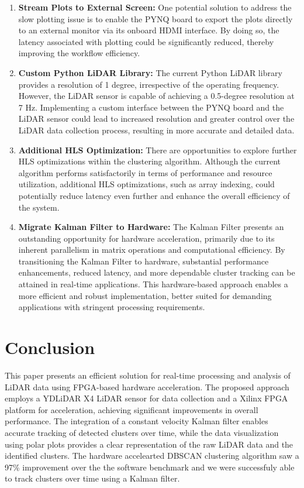 \documentclass[journal]{IEEEtran} %
\begin{document}
\begin{enumerate}
\item \textbf{Stream Plots to External Screen:}
One potential solution to address the slow plotting issue is to enable the PYNQ board to export the plots directly to an external monitor via its onboard HDMI interface. By doing so, the latency associated with plotting could be significantly reduced, thereby improving the workflow efficiency.

\item \textbf{Custom Python LiDAR Library:}
The current Python LiDAR library provides a resolution of 1 degree, irrespective of the operating frequency. However, the LiDAR sensor is capable of achieving a 0.5-degree resolution at 7 Hz. Implementing a custom interface between the PYNQ board and the LiDAR sensor could lead to increased resolution and greater control over the LiDAR data collection process, resulting in more accurate and detailed data.

\item \textbf{Additional HLS Optimization:}
There are opportunities to explore further HLS optimizations within the clustering algorithm. Although the current algorithm performs satisfactorily in terms of performance and resource utilization, additional HLS optimizations, such as array indexing, could potentially reduce latency even further and enhance the overall efficiency of the system.

\item \textbf{Migrate Kalman Filter to Hardware:}
The Kalman Filter presents an outstanding opportunity for hardware acceleration, primarily due to its inherent parallelism in matrix operations and computational efficiency. By transitioning the Kalman Filter to hardware, substantial performance enhancements, reduced latency, and more dependable cluster tracking can be attained in real-time applications. This hardware-based approach enables a more efficient and robust implementation, better suited for demanding applications with stringent processing requirements.

\end{enumerate}

\section{Conclusion}

This paper presents an efficient solution for real-time processing and analysis of LiDAR data using FPGA-based hardware acceleration. The proposed approach employs a YDLiDAR X4 LiDAR sensor for data collection and a Xilinx FPGA platform for acceleration, achieving significant improvements in overall performance. The integration of a constant velocity Kalman filter enables accurate tracking of detected clusters over time, while the data visualization using polar plots provides a clear representation of the raw LiDAR data and the identified clusters. The hardware accelearted DBSCAN clustering algorithm saw a 97\% improvement over the the software benchmark and we were successfuly able to track clusters over time using a Kalman filter.
\end{document}
